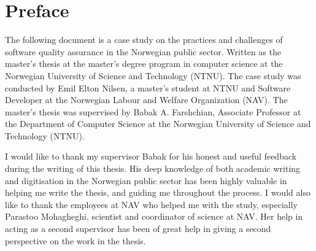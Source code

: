 \chapter*{Preface}
The following document is a case study on the practices and challenges of software quality assurance in the Norwegian public sector. Written as the master's thesis at the master's degree program in computer science at the Norwegian University of Science and Technology (NTNU). The case study was conducted by Emil Elton Nilsen, a master's student at NTNU and Software Developer at the Norwegian Labour and Welfare Organization (NAV). The master's thesis was supervised by Babak A. Farshchian, Associate Professor at the Department of Computer Science at the Norwegian University of Science and Technology (NTNU).

I would like to thank my supervisor Babak for his honest and useful feedback during the writing of this thesis. His deep knowledge of both academic writing and digitisation in the Norwegian public sector has been highly valuable in helping me write the thesis, and guiding me throughout the process. I would also like to thank the employees at NAV who helped me with the study, especially Parastoo Mohagheghi, scientist and coordinator of science at NAV. Her help in acting as a second supervisor has been of great help in giving a second perspective on the work in the thesis.